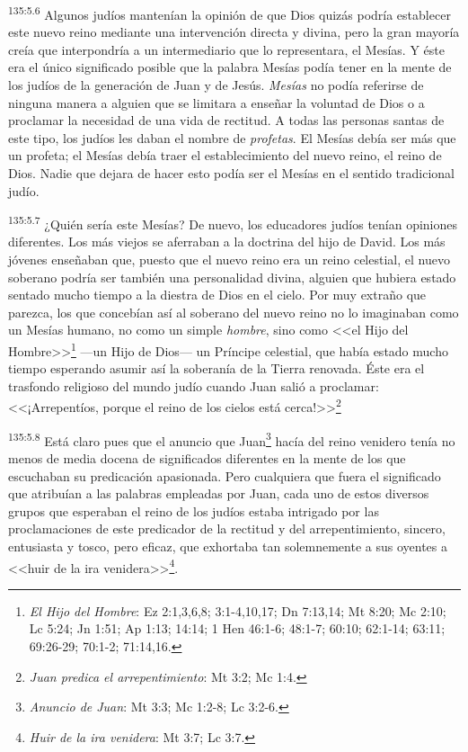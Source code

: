 \par 
\textsuperscript{135:5.6} Algunos judíos mantenían la opinión de que Dios quizás podría establecer este nuevo reino mediante una intervención directa y divina, pero la gran mayoría creía que interpondría a un intermediario que lo representara, el Mesías. Y éste era el único significado posible que la palabra Mesías podía tener en la mente de los judíos de la generación de Juan y de Jesús. \textit{Mesías} no podía referirse de ninguna manera a alguien que se limitara a enseñar la voluntad de Dios o a proclamar la necesidad de una vida de rectitud. A todas las personas santas de este tipo, los judíos les daban el nombre de \textit{profetas}. El Mesías debía ser más que un profeta; el Mesías debía traer el establecimiento del nuevo reino, el reino de Dios. Nadie que dejara de hacer esto podía ser el Mesías en el sentido tradicional judío.

\par 
\textsuperscript{135:5.7} ¿Quién sería este Mesías? De nuevo, los educadores judíos tenían opiniones diferentes. Los más viejos se aferraban a la doctrina del hijo de David. Los más jóvenes enseñaban que, puesto que el nuevo reino era un reino celestial, el nuevo soberano podría ser también una personalidad divina, alguien que hubiera estado sentado mucho tiempo a la diestra de Dios en el cielo. Por muy extraño que parezca, los que concebían así al soberano del nuevo reino no lo imaginaban como un Mesías humano, no como un simple \textit{hombre}, sino como <<el Hijo del Hombre>>\footnote{\textit{El Hijo del Hombre}: Ez 2:1,3,6,8; 3:1-4,10,17; Dn 7:13,14; Mt 8:20; Mc 2:10; Lc 5:24; Jn 1:51; Ap 1:13; 14:14; 1 Hen 46:1-6; 48:1-7; 60:10; 62:1-14; 63:11; 69:26-29; 70:1-2; 71:14,16.} ---un Hijo de Dios--- un Príncipe celestial, que había estado mucho tiempo esperando asumir así la soberanía de la Tierra renovada. Éste era el trasfondo religioso del mundo judío cuando Juan salió a proclamar: <<¡Arrepentíos, porque el reino de los cielos está cerca!>>\footnote{\textit{Juan predica el arrepentimiento}: Mt 3:2; Mc 1:4.}

\par 
\textsuperscript{135:5.8} Está claro pues que el anuncio que Juan\footnote{\textit{Anuncio de Juan}: Mt 3:3; Mc 1:2-8; Lc 3:2-6.} hacía del reino venidero tenía no menos de media docena de significados diferentes en la mente de los que escuchaban su predicación apasionada. Pero cualquiera que fuera el significado que atribuían a las palabras empleadas por Juan, cada uno de estos diversos grupos que esperaban el reino de los judíos estaba intrigado por las proclamaciones de este predicador de la rectitud y del arrepentimiento, sincero, entusiasta y tosco, pero eficaz, que exhortaba tan solemnemente a sus oyentes a <<huir de la ira venidera>>\footnote{\textit{Huir de la ira venidera}: Mt 3:7; Lc 3:7.}.


